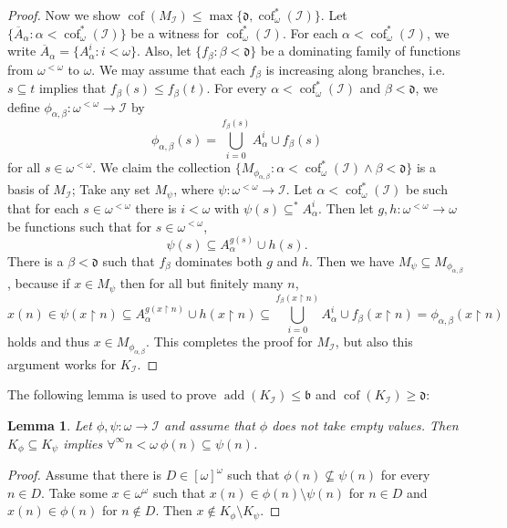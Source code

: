 \documentclass[a4paper,12pt]{amsart}
\newtheorem{lem}[thm]{Lemma}
\theoremstyle{definition}
\numberwithin{thm}{section}
\numberwithin{equation}{section}
\newcommand{\bb}{\mathfrak{b}}
\newcommand{\dd}{\mathfrak{d}}
\DeclareMathOperator{\add}{add}
\DeclareMathOperator{\cof}{cof}
\newcommand{\I}{\mathscr{I}}
\renewcommand{\subset}{\subseteq}
\begin{document}
\begin{proof}
        Now we show $\cof(M_\I)\leq\max\{\dd, \cof^*_\omega(\I)\}$. Let $\{\overline{A}_\alpha:\alpha<\cof^*_\omega(\I)\}$ be a witness for $\cof^*_\omega(\I)$. For each $\alpha<\cof^*_\omega(\I)$, we write $\overline{A}_\alpha = \{A_\alpha^i:i<\omega\}$.
        Also, let $\{f_\beta:\beta<\dd\}$ be a dominating family of functions from $\omega^{<\omega}$ to $\omega$. We may assume that each $f_\beta$ is increasing along branches, i.e.\ $s\subset t$ implies that $f_\beta(s)\leq f_\beta(t)$. For every $\alpha < \cof^*_\omega(\I)$ and $\beta<\dd$, we define $\phi_{\alpha, \beta}\colon\omega^{<\omega}\to\I$ by
        \[
        \phi_{\alpha, \beta}(s) = \bigcup_{i=0}^{f_{\beta}(s)}A_\alpha^i \cup f_\beta(s)
        \]
        for all $s\in\omega^{<\omega}$. We claim the collection $\{M_{\phi_{\alpha, \beta}}:\alpha<\cof^*_\omega(\I)\land\beta<\dd\}$ is a basis of $M_\I$; Take any set $M_\psi$, where $\psi\colon\omega^{<\omega}\to\I$. Let $\alpha<\cof^*_\omega(\I)$ be such that for each $s\in\omega^{<\omega}$ there is $i<\omega$ with $\psi(s)\subset^* A_{\alpha}^i$. Then let $g, h\colon\omega^{<\omega}\to\omega$ be functions such that for $s\in\omega^{<\omega}$,
        \[
        \psi(s)\subset A_\alpha^{g(s)} \cup h(s).
        \]
        There is a $\beta<\dd$ such that $f_\beta$ dominates both $g$ and $h$. Then we have $M_\psi\subseteq M_{\phi_{\alpha, \beta}}$, because if $x\in M_\psi$ then for all but finitely many $n$,
        \[
        x(n)\in\psi(x\upharpoonright n)\subset A_\alpha^{g(x\upharpoonright n)}\cup h(x\upharpoonright n)\subset \bigcup_{i=0}^{f_\beta(x\upharpoonright n)}A_\alpha^i \cup f_\beta(x\upharpoonright n) = \phi_{\alpha, \beta}(x\upharpoonright n)
        \]
        holds and thus $x\in M_{\phi_{\alpha, \beta}}$. This completes the proof for $M_\I$, but also this argument works for $K_\I$.
    \end{proof}
    
    The following lemma is used to prove $\add(K_\I)\leq\bb$ and $\cof(K_\I)\geq\dd$:
    
    \begin{lem}\label{lem:K_phi_psi}
        Let $\phi,\psi\colon \omega\to\I$ and assume that $\phi$ does not take empty values. Then $K_\phi\subseteq K_\psi$ implies $\forall^\infty n<\omega~\phi(n)\subset\psi(n)$.
    \end{lem}
    \begin{proof}
        Assume that there is $D\in[\omega]^\omega$ such that $\phi(n)\not\subset \psi(n)$ for every $n\in D$. Take some $x\in\omega^\omega$ such that $x(n)\in \phi(n)\setminus \psi(n)$ for $n\in D$ and $x(n)\in\phi(n)$ for $n\notin D$. Then $x\notin K_\phi\setminus K_\psi$.
    \end{proof}
    
\end{document}
